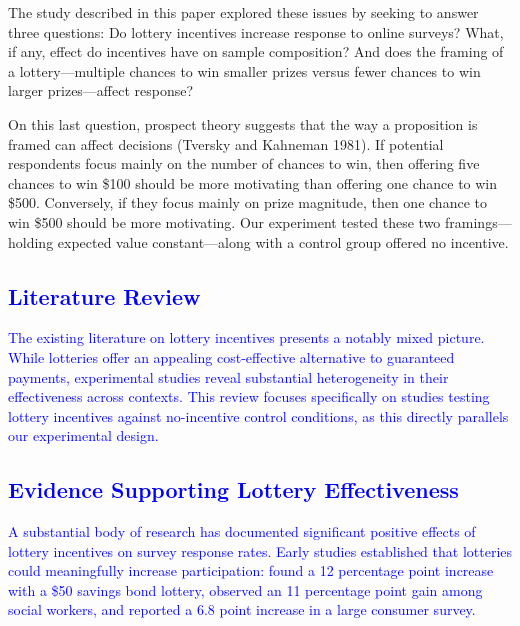 \documentclass[12pt]{article}
\begin{document}
The study described in this paper explored these issues by seeking to answer three questions: Do lottery incentives increase response to online surveys? What, if any, effect do incentives have on sample composition? And does the framing of a lottery—multiple chances to win smaller prizes versus fewer chances to win larger prizes—affect response?

On this last question, prospect theory suggests that the way a proposition is framed can affect decisions (Tversky and Kahneman 1981). If potential respondents focus mainly on the number of chances to win, then offering five chances to win \$100 should be more motivating than offering one chance to win \$500. Conversely, if they focus mainly on prize magnitude, then one chance to win \$500 should be more motivating. Our experiment tested these two framings—holding expected value constant—along with a control group offered no incentive.


\textcolor{blue}{\section{Literature Review}}

\textcolor{blue}{The existing literature on lottery incentives presents a notably mixed picture. While lotteries offer an appealing cost-effective alternative to guaranteed payments, experimental studies reveal substantial heterogeneity in their effectiveness across contexts. This review focuses specifically on studies testing lottery incentives against no-incentive control conditions, as this directly parallels our experimental design.}

\textcolor{blue}{\subsection{Evidence Supporting Lottery Effectiveness}}

\textcolor{blue}{A substantial body of research has documented significant positive effects of lottery incentives on survey response rates. Early studies established that lotteries could meaningfully increase participation: \citet{mccool1991} found a 12 percentage point increase with a \$50 savings bond lottery, \citet{blythe1986} observed an 11 percentage point gain among social workers, and \citet{balakrishnan1992} reported a 6.8 point increase in a large consumer survey.}
\end{document}
